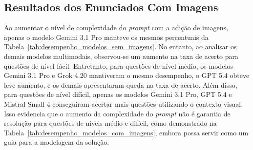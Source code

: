 \documentclass[sigconf]{acmart}
\begin{document}
\begin{table}[H]
  \centering
  \caption{Comparativo de Desempenho dos Modelos Multimodais sem Imagens}
  \label{tab:desempenho_modelos_sem_imagens}
\end{table}

\subsection{Resultados dos Enunciados Com Imagens}
\label{subsec:resultados_com_imagens}

Ao aumentar o nível de complexidade do \textit{prompt} com a adição de imagens, apenas o modelo Gemini 3.1 Pro manteve os mesmos percentuais da Tabela~\ref{tab:desempenho_modelos_sem_imagens}. No entanto, ao analisar os demais modelos multimodais, observou-se um aumento na taxa de acerto para questões de nível fácil. Entretanto, para questões de nível médio, os modelos Gemini 3.1 Pro e Grok 4.20 mantiveram o mesmo desempenho, o GPT 5.4 obteve leve aumento, e os demais apresentaram queda na taxa de acerto. Além disso, para questões de nível difícil, apenas os modelos Gemini 3.1 Pro, GPT 5.4 e Mistral Small 4 conseguiram acertar mais questões utilizando o contexto visual. Isso evidencia que o aumento da complexidade do \textit{prompt} não é garantia de resolução para questões de níveis médio e difícil, como demonstrado na Tabela~\ref{tab:desempenho_modelos_com_imagens}, embora possa servir como um guia para a modelagem da solução.
\end{document}
